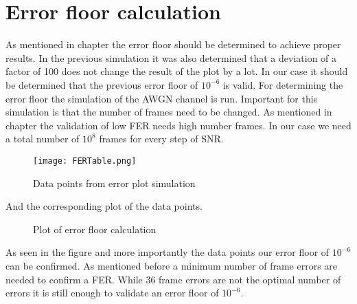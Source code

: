 \section{Error floor calculation}
As mentioned in chapter  the error floor should be determined to achieve proper results. In the previous simulation it was also determined that a deviation of a factor of 100 does not change the result of the plot by a lot. 
In our case it should be determined that the previous error floor of $10^{-6}$ is valid. 
\newline
For determining the error floor the simulation of the \gls{AWGN} channel is run. Important for this simulation is that the number of frames need to be changed. As mentioned in chapter  the validation of low \gls{FER} needs high number frames. In our case we need a total number of $10^{8}$ frames for every step of SNR.
\begin{figure}[!htb]
	\centering
	\texttt{[image: FERTable.png]}
	\caption{Data points from error plot simulation}
	\label{fig:ErrorTable}
\end{figure}
And the corresponding plot of the data points.
\begin{figure}[!htb]
	\setlength{}
	\setlength\fheight{0.4\textheight}
	\centering
	
	\caption{Plot of error floor calculation}
	\label{fig:ErrorFloor}
\end{figure}
As seen in the figure and more importantly the data points our error floor of $10^{-6}$ can be confirmed. As mentioned before a minimum number of frame errors are needed to confirm a \gls{FER}. While 36 frame errors are not the optimal number of errors it is still enough to validate an error floor of $10^{-6}$.






\clearpage
